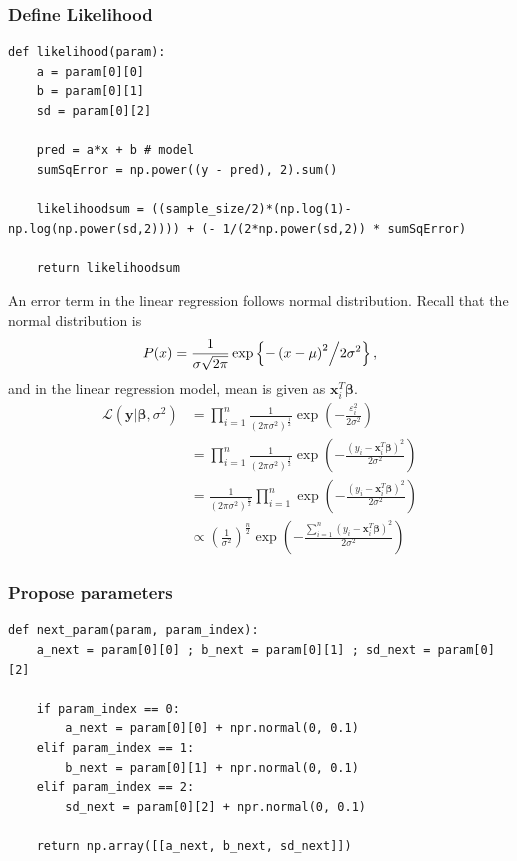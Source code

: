 \documentclass[a4paper,10.5pt,uplatex]{jsarticle}  %
\begin{document}
\subsubsection{Define Likelihood}
\begin{lstlisting}
def likelihood(param):
    a = param[0][0]
    b = param[0][1]
    sd = param[0][2]
    
    pred = a*x + b # model
    sumSqError = np.power((y - pred), 2).sum()
    
    likelihoodsum = ((sample_size/2)*(np.log(1)-np.log(np.power(sd,2)))) + (- 1/(2*np.power(sd,2)) * sumSqError)
    
    return likelihoodsum
\end{lstlisting}
An error term in the linear regression follows normal distribution. Recall that the normal distribution is $$P(x) = \frac{1}{{\sigma \sqrt {2\pi } }} \exp\left\{  {{{ - \left( {x - \mu } \right)^2 } \mathord{\left/ {\vphantom {{ - \left( {x - \mu } \right)^2 } {2\sigma ^2 }}} \right. \kern-\nulldelimiterspace} {2\sigma ^2 }}}  \right\},$$ and in the linear regression model, mean is given as $\mathbf{x}_i^T \boldsymbol{\beta}$. 
\begin{align}
  \mathcal{L}(\mathbf{y}|\boldsymbol{\beta}, \sigma^2) &= \prod_{i=1}^{n} \frac{1}{(2 \pi \sigma^2)^{\frac{1}{2}}} \exp \left( - \frac{\varepsilon_i^2}{2 \sigma^2}  \right) \\[10pt]
                                                       &= \prod_{i=1}^{n} \frac{1}{(2 \pi \sigma^2)^{\frac{1}{2}}} \exp \left( - \frac{(y_i - \mathbf{x}_i^T \boldsymbol{\beta})^2}{2 \sigma^2}  \right) \\[10pt]
 &= \frac{1}{(2 \pi \sigma^2)^{\frac{n}{2}}} \prod_{i=1}^{n}  \exp \left( - \frac{(y_i - \mathbf{x}_i^T \boldsymbol{\beta})^2}{2 \sigma^2}  \right) \\[10pt]
                                                       &\propto \left( \frac{1}{\sigma^2} \right)^{\frac{n}{2}} \exp \left( - \frac{\sum_{i=1}^{n} (y_i - \mathbf{x}_i^T \boldsymbol{\beta})^2 }{2 \sigma^2} \right)
\end{align}

\subsubsection{Propose parameters}
\begin{lstlisting}[caption={Draw a parameter one by one}]
def next_param(param, param_index):
    a_next = param[0][0] ; b_next = param[0][1] ; sd_next = param[0][2]
    
    if param_index == 0:
        a_next = param[0][0] + npr.normal(0, 0.1)
    elif param_index == 1:
        b_next = param[0][1] + npr.normal(0, 0.1)
    elif param_index == 2:
        sd_next = param[0][2] + npr.normal(0, 0.1)
        
    return np.array([[a_next, b_next, sd_next]])
\end{lstlisting}
\end{document}
